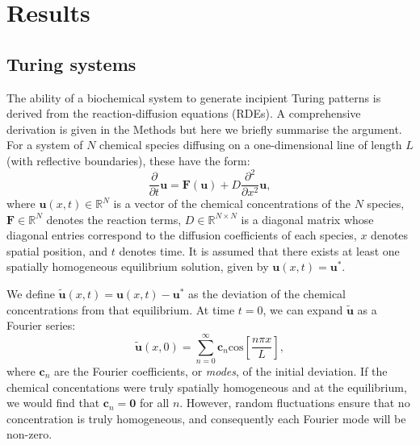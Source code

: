\section*{Results}

\subsection*{Turing systems}

The ability of a biochemical system to generate incipient Turing patterns is derived from the reaction-diffusion equations (RDEs). A comprehensive derivation is given in the Methods but here we briefly summarise the argument. For a system of $N$ chemical species diffusing on a one-dimensional line of length $L$ (with reflective boundaries), these have the form:
\begin{equation}\label{rde}
\frac{\partial}{\partial t} \mathbf{u}=\mathbf{F}(\mathbf{u})+D\frac{\partial^2}{\partial x^2} \mathbf{u},
\end{equation}
where $\mathbf{u}(x,t)\in \mathbb{R}^N$ is a vector of the chemical concentrations of the $N$ species, $\mathbf{F}\in \mathbb{R}^N$ denotes the reaction terms, $D\in \mathbb{R}^{N\times N}$ is a diagonal matrix whose diagonal entries correspond to the diffusion coefficients of each species, $x$ denotes spatial position, and $t$ denotes time. It is assumed that there exists at least one spatially homogeneous equilibrium solution, given by $\mathbf{u}(x,t)=\mathbf{u}^*$. 

We define $\tilde{\mathbf{u}}(x,t)=\mathbf{u}(x,t)-\mathbf{u}^*$ as the deviation of the chemical concentrations from that equilibrium. At time $t=0$, we can expand $\tilde{\mathbf{u}}$ as a Fourier series:
\begin{equation}\label{fourier1}
\tilde{\mathbf{u}}(x,0)=\sum_{n=0}^\infty \mathbf{c}_n\text{cos}\left[\frac{n\pi x}{L}\right],
\end{equation}
where $\mathbf{c}_n$ are the Fourier coefficients, or \emph{modes}, of the initial deviation. If the chemical concentations were truly spatially homogeneous and at the equilibrium, we would find that $\mathbf{c}_n=\mathbf{0}$ for all $n$. However, random fluctuations ensure that no concentration is truly homogeneous, and consequently each Fourier mode will be non-zero. 

